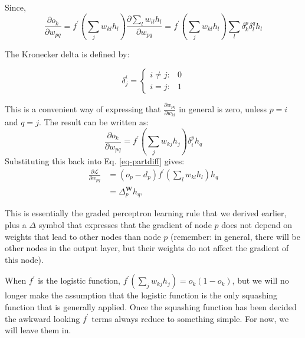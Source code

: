     Since,
    \begin{equation}
    \frac{\partial o_k}{\partial w_{pq}} = f^{\prime}(\sum_j w_{kl} h_l) \frac{\partial \sum_l w_{il}h_l}{\partial w_{pq}} = f^{\prime}(\sum_j w_{kl}h_l)\sum_l \delta^p_k \delta^q_l h_l
    \end{equation}

    The Kronecker delta is defined by:

    $$
    \delta^i_j = \left\{ \begin{array}{rl} i \ne j: & 0 \\ i = j: & 1 \end{array} \right.
    $$

    This is a convenient way of expressing that $\frac{\partial w_{pq}}{\partial w_{kl}}$ in general is zero, unless $p=i$ and $q=j$.
    The result can be written as:
    \begin{equation}
      \frac{\partial o_k}{\partial w_{pq}} = f^{\prime}(\sum_j w_{kj}h_j) \delta^p_i h_q 
    \end{equation}
    Substituting this back into Eq. \ref{eq-partdiff} gives:
    \begin{align}
     \frac{\partial \mathcal{L}}{\partial w_{pq}} &  = (o_p -d_p)f^{\prime}(\sum_l w_{kl} h_l) h_q  \nonumber \\
                                         & = \Delta^{\boldsymbol{W}}_p h_q,
     \end{align}
     
    This is essentially the graded perceptron learning rule that we derived earlier, plus a $\Delta$ symbol that expresses that the gradient of node $p$ does not depend
    on weights that lead to other nodes than node $p$ (remember: in general, there will be other nodes in the output layer, but their weights do not affect the gradient
    of this node).

    When $f^{\prime}$ is the logistic function, $f^{\prime}(\sum_j w_{kj}h_j) = o_k(1 - o_k)$, but we will no longer make the assumption that the logistic function is the
    only squashing function that is generally applied.  Once the squashing
    function has been decided the awkward looking $f^{\prime}$ terms always reduce to something simple. For now, we will leave them in.

